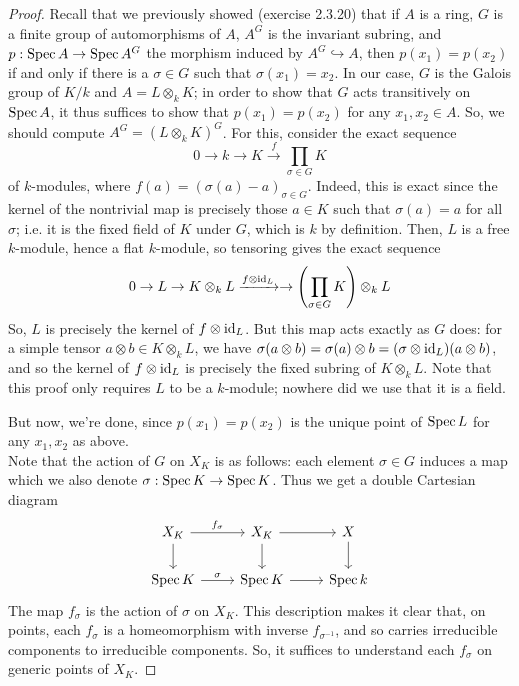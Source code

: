 \begin{proof}
	Recall that we previously showed (exercise 2.3.20) that if $A$ is a ring, $G$ is a finite group of automorphisms of $A$, $A^G$ is the invariant subring, and $p : \operatorname{Spec} A \to \operatorname{Spec} A^G$ the morphism induced by $A^G \hookrightarrow A$, then $p(x_1) = p(x_2)$ if and only if there is a $\sigma \in G$ such that $\sigma(x_1) = x_2$.
	In our case, $G$ is the Galois group of $K/k$ and $A = L \otimes_k K$; in order to show that $G$ acts transitively on $\operatorname{Spec} A$, it thus suffices to show that $p(x_1) = p(x_2)$ for any $x_1,x_2 \in A$. So, we should compute $A^G = (L \otimes_k K)^G$. For this, consider the exact sequence
	\[ 0 \to k \to K \xrightarrow{f} \prod_{\sigma \in G} K \]
	of $k$-modules, where $f(a) = (\sigma(a)-a)_{\sigma \in G}$. Indeed, this is exact since the kernel of the nontrivial map is precisely those $a \in K$ such that $\sigma(a) = a$ for all $\sigma$; i.e. it is the fixed field of $K$ under $G$, which is $k$ by definition. Then, $L$ is a free $k$-module, hence a flat $k$-module, so tensoring gives the exact sequence
	\[ 0 \to L \to K \otimes_k L \xrightarrow{f \otimes \operatorname{id}_L} \to \left(\prod_{\sigma \in G} K\right) \otimes_k L \]
	So, $L$ is precisely the kernel of $f \otimes \operatorname{id}_L$. But this map acts exactly as $G$ does: for a simple tensor $a \otimes b \in K \otimes_k L$, we have $\sigma(a \otimes b) = \sigma(a) \otimes b = (\sigma \otimes \operatorname{id}_L)(a \otimes b)$, and so the kernel of $f \otimes \operatorname{id}_L$ is precisely the fixed subring of $K \otimes_k L$. Note that this proof only requires $L$ to be a $k$-module; nowhere did we use that it is a field.
	
	But now, we're done, since $p(x_1) = p(x_2)$ is the unique point of $\operatorname{Spec} L$ for any $x_1,x_2$ as above. \\
	
	Note that the action of $G$ on $X_K$ is as follows: each element $\sigma \in G$ induces a map which we also denote $\sigma : \operatorname{Spec} K \to \operatorname{Spec} K$. Thus we get a double Cartesian diagram
	\[ \begin{tikzcd} X_K \arrow[r, "f_\sigma"] \arrow[d] & X_K \arrow[r] \arrow[d] & X \arrow[d] \\ \Spec K \arrow[r, "\sigma"] & \Spec K \arrow[r] & \Spec k \end{tikzcd} \]
	The map $f_\sigma$ is the action of $\sigma$ on $X_K$. This description makes it clear that, on points, each $f_\sigma$ is a homeomorphism with inverse $f_{\sigma^{-1}}$, and so carries irreducible components to irreducible components. So, it suffices to understand each $f_\sigma$ on generic points of $X_K$.
	

\end{proof}
